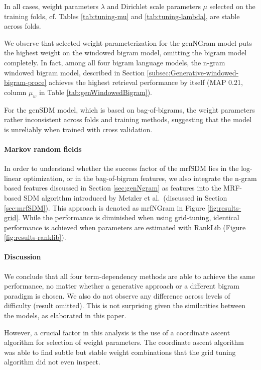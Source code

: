 \documentclass[]{article}
\begin{document}
In all cases, weight parameters $\lambda$ and Dirichlet scale parameters
$\mu$ selected on the training folds, cf. Tables \ref{tab:tuning-mu}
and \ref{tab:tuning-lambda}, are stable across folds.

We observe that selected weight parameterization for the genNGram
model puts the highest weight on the windowed bigram model, omitting
the bigram model completely. In fact, among all four bigram language
models, the n-gram windowed bigram model, described in Section \ref{subsec:Generative-windowed-bigram-proce} achieves the highest retrieval
performance by itself (MAP 0.21, column $\mu_w$ in Table \ref{tab:genWindowedBigram}).

For the genSDM model, which is based on bag-of-bigrams, the weight parameters rather inconsistent across folds and training methods, suggesting that the model is unreliably when trained with cross validation.

\paragraph{Markov random fields}

In order to understand whether the success factor of the mrfSDM lies
in the log-linear optimization, or in the bag-of-bigram features,
we also integrate the n-gram based features discussed in Section \ref{sec:genNgram}
as features into the MRF-based SDM algorithm introduced by Metzler
et al.\ (discussed in Section \ref{sec:mrfSDM}). This approach is denoted
as mrfNGram in Figure \ref{fig:results-grid}. While the performance
is diminished when using grid-tuning, identical performance is achieved when parameters are estimated with RankLib (Figure \ref{fig:results-ranklib}).

\paragraph{Discussion}

We conclude that all four term-dependency methods are able to achieve the same
performance, no matter whether
a generative approach or a different bigram paradigm is chosen.
 We also do not observe any difference across levels
of difficulty (result omitted). This is not surprising given the similarities between
the models, as elaborated in this paper.

However, a crucial factor in this analysis is the use of a coordinate ascent
algorithm for selection of weight parameters. The coordinate ascent
algorithm was able to find subtle but stable weight combinations that
the grid tuning algorithm did not even inspect.
\end{document}
